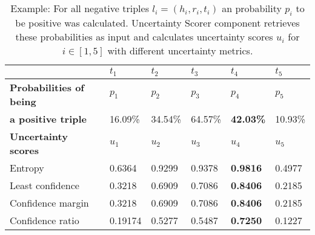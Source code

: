 \begin{table}[h]
    \centering
    \begin{tabular}{llllll}
        \toprule
        
        &  \textbf{$t_1$} & \textbf{$t_2$} & \textbf{$t_3$} & \textbf{$t_4$} & \textbf{$t_5$} \\
         
        \midrule
        
        \textbf{Probabilities of being}
         & $p_1$ & $p_2$ & $p_3$ & $p_4$ & $p_5$   \\
         
        \textbf{a positive triple}
        & 16.09\% 
        & 34.54\% 
        & 64.57\%
        & \textbf{42.03\%} 
        & 10.93\%  \\
        
        \midrule
        \textbf{Uncertainty scores}
        & $u_1$ & $u_2$ & $u_3$ & $u_4$ & $u_5$ \\
        
        Entropy 
        & 0.6364 & 0.9299 & 0.9378 & \textbf{0.9816} & 0.4977 \\
        
        Least confidence 
        & 0.3218 & 0.6909 & 0.7086 & \textbf{0.8406} & 0.2185 \\
        
        Confidence margin
        & 0.3218 & 0.6909 & 0.7086 & \textbf{0.8406} & 0.2185 \\
        
        Confidence ratio
        & 0.19174 & 0.5277 & 0.5487 & \textbf{0.7250} & 0.1227\\
        
        \bottomrule
    \end{tabular}
    \caption{Example: For all negative triples $l_i = (h_i, r_i, t_i)$ an probability $p_i$ to be positive was calculated. Uncertainty Scorer component retrieves these probabilities as input and calculates uncertainty scores $u_i$ for $i \in [1, 5]$ with different uncertainty metrics.}
\label{tab:uncertainty_scores}
\end{table}